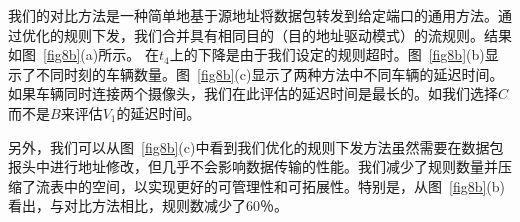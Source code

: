 \documentclass{ctexart}
\begin{document}
我们的对比方法是一种简单地基于源地址将数据包转发到给定端口的通用方法。通过优化的规则下发，我们合并具有相同目的（目的地址驱动模式）的流规则。结果如图~\ref{fig8b}(a)所示。 在$t_ {4}$上的下降是由于我们设定的规则超时。图~\ref{fig8b}(b)显示了不同时刻的车辆数量。图~\ref{fig8b}(c)显示了两种方法中不同车辆的延迟时间。如果车辆同时连接两个摄像头，我们在此评估的延迟时间是最长的。如我们选择$C$而不是$B$来评估$V_ {1}$的延迟时间。



另外，我们可以从图~\ref{fig8b}(c)中看到我们优化的规则下发方法虽然需要在数据包报头中进行地址修改，但几乎不会影响数据传输的性能。我们减少了规则数量并压缩了流表中的空间，以实现更好的可管理性和可拓展性。特别是，从图~\ref{fig8b}(b)看出，与对比方法相比，规则数减少了60％。


\end{document}
